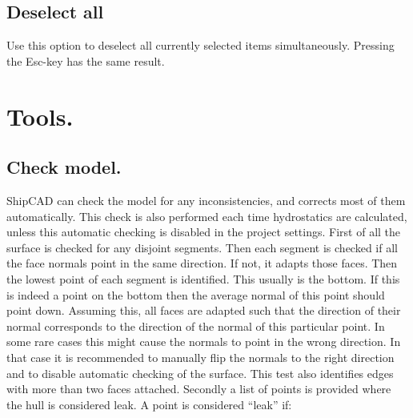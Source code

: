 \documentclass[12pt]{article}
\begin{document}
\subsection{Deselect all}
Use this option to deselect all currently selected items simultaneously. Pressing the Esc-key has
the same result.

\pagebreak

\section{Tools.}

\subsection{Check model.} \label{check-model}
ShipCAD can check the model for any inconsistencies, and corrects most
of them automatically.  This check is also performed each time
hydrostatics are calculated, unless this automatic checking is
disabled in the project settings. First of all the surface is checked
for any disjoint segments. Then each segment is checked if all the
face normals point in the same direction. If not, it adapts those
faces. Then the lowest point of each segment is identified. This
usually is the bottom. If this is indeed a point on the bottom then
the average normal of this point should point down. Assuming this, all
faces are adapted such that the direction of their normal corresponds
to the direction of the normal of this particular point. In some rare
cases this might cause the normals to point in the wrong direction. In
that case it is recommended to manually flip the normals to the right
direction and to disable automatic checking of the surface. This test
also identifies edges with more than two faces attached. Secondly a
list of points is provided where the hull is considered leak. A point
is considered ``leak'' if:
\end{document}
